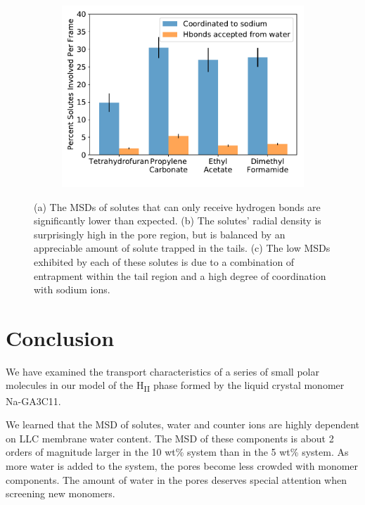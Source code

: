 \documentclass[journal=jpcbfk,manuscript=article]{achemso}
\begin{document}
\begin{figure}[!htb]
\begin{subfigure}{0.325\textwidth}
  \caption{}\label{fig:nondonors_rdf}
  \end{subfigure}
  \begin{subfigure}{0.325\textwidth}
  \includegraphics[width=\textwidth]{nondonor_hbonds.pdf}
  \caption{}\label{fig:nondonors_hbonds}
  \end{subfigure}
  \caption{(a) The MSDs of solutes that can only receive hydrogen bonds are
  significantly lower than expected. (b) The solutes' radial density
  is surprisingly high in the pore region, but is balanced by an appreciable
  amount of solute trapped in the tails. (c) The low MSDs exhibited by each of these
  solutes is due to a combination of entrapment within the tail region and a high 
  degree of coordination with sodium ions.}\label{fig:nondonors}
  \end{figure}

  \section{Conclusion}

  We have examined the transport characteristics of a series of small polar
  molecules in our model of the H\textsubscript{II} phase formed by the liquid 
  crystal monomer Na-GA3C11.

  We learned that the MSD of solutes, water and counter ions are highly 
  dependent on LLC membrane water content. The MSD of these components is about
  2 orders of magnitude larger in the 10 wt\% system than in the 5 wt\% system.
  As more water is added to the system, the pores become less crowded with monomer
  components. The amount of water in the pores deserves special attention when 
  screening new monomers.
  
\end{document}
